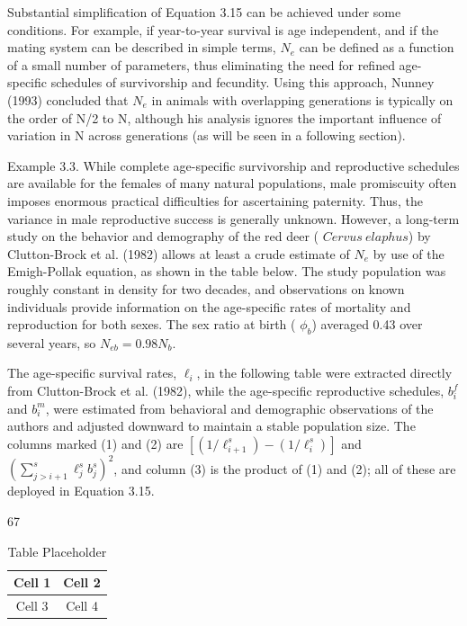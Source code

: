 \documentclass{article}
\begin{document}
Substantial simplification of Equation 3.15 can be achieved under some conditions. For example, if year-to-year survival is age independent, and if the mating system can be described in simple terms,  $ N_{e} $ can be defined as a function of a small number of parameters, thus eliminating the need for refined age-specific schedules of survivorship and fecundity. Using this approach, Nunney (1993) concluded that  $ N_{e} $ in animals with overlapping generations is typically on the order of N/2 to N, although his analysis ignores the important influence of variation in N across generations (as will be seen in a following section).

Example 3.3. While complete age-specific survivorship and reproductive schedules are available for the females of many natural populations, male promiscuity often imposes enormous practical difficulties for ascertaining paternity. Thus, the variance in male reproductive success is generally unknown. However, a long-term study on the behavior and demography of the red deer ( $ Cervus\ elaphus $) by Clutton-Brock et al. (1982) allows at least a crude estimate of  $ N_e $ by use of the Emigh-Pollak equation, as shown in the table below. The study population was roughly constant in density for two decades, and observations on known individuals provide information on the age-specific rates of mortality and reproduction for both sexes. The sex ratio at birth ( $ \phi_b $) averaged 0.43 over several years, so  $ N_{eb} = 0.98 N_b $.

The age-specific survival rates,  $ \ell_i $, in the following table were extracted directly from Clutton-Brock et al. (1982), while the age-specific reproductive schedules,  $ b_i^f $ and  $ b_i^m $, were estimated from behavioral and demographic observations of the authors and adjusted downward to maintain a stable population size. The columns marked (1) and (2) are  $ \left[\left(1/\ell_{i+1}^s\right) - \left(1/\ell_i^s\right)\right] $ and  $ \left(\sum_{j>i+1}^s \ell_j^s b_j^s\right)^2 $, and column (3) is the product of (1) and (2); all of these are deployed in Equation 3.15.

67

\begin{table}[h]
\centering
\begin{tabular}{|c|c|}
\hline
Cell 1 & Cell 2 \\
\hline
Cell 3 & Cell 4 \\
\hline
\end{tabular}
\caption{Table Placeholder}
\end{table}
\end{document}

